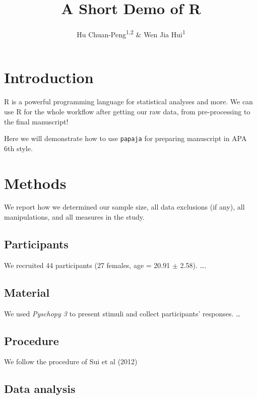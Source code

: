 \documentclass[
  man]{apa6}
\title{A Short Demo of R}
\author{Hu Chuan-Peng\textsuperscript{1,2} \& Wen Jia Hui\textsuperscript{1}}
\date{}
\affiliation{\vspace{0.5cm}\textsuperscript{1} Nanjing Normal University\\\textsuperscript{2} Chinese Open Science Network}
\begin{document}
\maketitle

\section{Introduction}\label{introduction}

R is a powerful programming language for statistical analyses and more. We can use R for the whole workflow after getting our raw data, from pre-processing to the final manuscript!

Here we will demonstrate how to use \texttt{papaja} for preparing manuscript in APA 6th style.

\section{Methods}\label{methods}

We report how we determined our sample size, all data exclusions (if any), all manipulations, and all measures in the study.

\subsection{Participants}\label{participants}

We recruited 44 participants (27 females, age = 20.91 \(\pm\) 2.58). \ldots.

\subsection{Material}\label{material}

We used \emph{Pyschopy 3} to present stimuli and collect participants' responses. \ldots{}

\subsection{Procedure}\label{procedure}

We follow the procedure of Sui et al (2012)

\subsection{Data analysis}\label{data-analysis}
\end{document}
